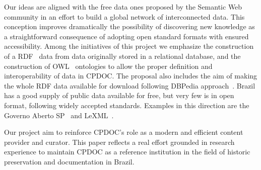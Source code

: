 Our ideas are aligned with the free data ones proposed by the Semantic
Web community in an effort to build a global network of interconnected
data. This conception improves dramatically the possibility of
discovering new knowledge as a straightforward consequence of adopting
open standard formats with ensured accessibility. Among the
initiatives of this project we emphasize the construction of a
RDF~\cite{rdf-primer} data from data originally stored in a relational
database, and the construction of OWL~\cite{owl} ontologies to allow
the proper definition and interoperability of data in CPDOC. The
proposal also includes the aim of making the whole RDF data available
for download following DBPedia approach~\cite{dbpedia}. Brazil has a
good supply of public data available for free, but very few is in open
format, following widely accepted standards. Examples in this
direction are the Governo Aberto SP~\cite{gasp} and
LeXML~\cite{lexml}.
   
Our project aim to reinforce CPDOC's role as a modern and efficient
content provider and curator. This paper reflects a real effort
grounded in research experience to maintain CPDOC as a reference
institution in the field of historic preservation and documentation in
Brazil.





